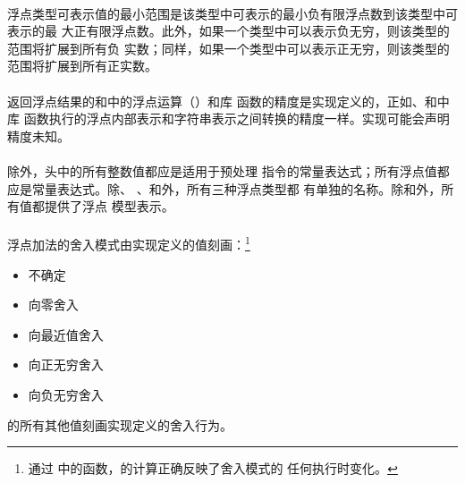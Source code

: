 \paragraph{}
浮点类型可表示值的最小范围是该类型中可表示的最小负有限浮点数到该类型中可表示的最
大正有限浮点数。此外，如果一个类型中可以表示负无穷，则该类型的范围将扩展到所有负
实数；同样，如果一个类型中可以表示正无穷，则该类型的范围将扩展到所有正实数。

\paragraph{}
返回浮点结果的和中的浮点运算（）和库
函数的精度是实现定义的，正如、和中库
函数执行的浮点内部表示和字符串表示之间转换的精度一样。实现可能会声明精度未知。

\paragraph{}
除外，头中的所有整数值都应是适用于预处理
指令的常量表达式；所有浮点值都应是常量表达式。除、
、和外，所有三种浮点类型都
有单独的名称。除和外，所有值都提供了浮点
模型表示。

\paragraph{}
浮点加法的舍入模式由实现定义的值刻画：\footnote{通过
中的函数，的计算正确反映了舍入模式的
任何执行时变化。}
\begin{itemize}
  \item[]{  \qquad 不确定}
  \item[]{ \qquad 向零舍入}
  \item[]{ \qquad 向最近值舍入}
  \item[]{ \qquad 向正无穷舍入}
  \item[]{ \qquad 向负无穷舍入}
\end{itemize}
的所有其他值刻画实现定义的舍入行为。

